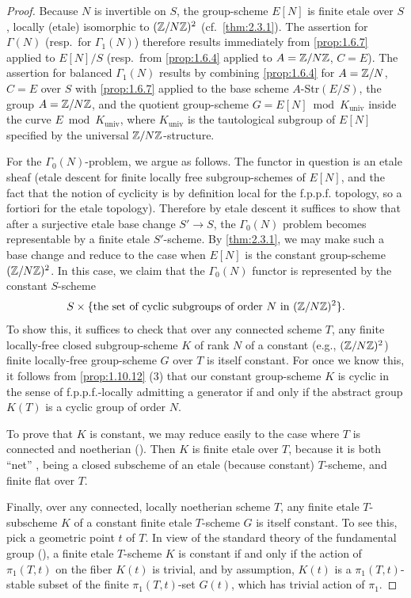\begin{proof}
Because $N$ is invertible on $S$, the group-scheme $E[N]$ is finite etale over $S$, locally (etale) isomorphic to $(\mathbb{Z}/N\mathbb{Z})^2$ (cf.\ \ref{thm:2.3.1}). The assertion for $\Gamma(N)$ (resp.\ for $\Gamma_1(N)$) therefore results immediately from \ref{prop:1.6.7} applied to $E[N]/S$ (resp.\ from \ref{prop:1.6.4} applied to $A = \mathbb{Z}/N\mathbb{Z}$, $C = E$). The assertion for balanced $\Gamma_1(N)$ results by combining \ref{prop:1.6.4} for $A = \mathbb{Z}/N$, $C = E$ over $S$ with \ref{prop:1.6.7} applied to the base scheme $A$-Str$(E/S)$, the group $A = \mathbb{Z}/N\mathbb{Z}$, and the quotient group-scheme $G = E[N] \bmod K_{\mathrm{univ}}$ inside the curve $E \bmod K_{\mathrm{univ}}$, where $K_{\mathrm{univ}}$ is the tautological subgroup of $E[N]$ specified by the universal $\mathbb{Z}/N\mathbb{Z}$-structure.

For the $\Gamma_0(N)$-problem, we argue as follows. The functor in question is an etale sheaf (etale descent \cite[I, 7.9]{SGA} for finite locally free subgroup-schemes of $E[N]$, and the fact that the notion of cyclicity is by definition local for the f.p.p.f. topology, so a fortiori for the etale topology). Therefore by etale descent it suffices to show that after a surjective etale base change $S' \to S$, the $\Gamma_0(N)$ problem becomes representable by a finite etale $S'$-scheme. By \ref{thm:2.3.1}, we may make such a base change and reduce to the case when $E[N]$ is the constant group-scheme $(\mathbb{Z}/N\mathbb{Z})^2$. In this case, we claim that the $\Gamma_0(N)$ functor is represented by the constant $S$-scheme
\[
S \times \{\text{the set of cyclic subgroups of order } N \text{ in } (\mathbb{Z}/N\mathbb{Z})^2\}.
\]
To show this, it suffices to check that over any connected scheme $T$, any finite locally-free closed subgroup-scheme $K$ of rank $N$ of a constant (e.g., $(\mathbb{Z}/N\mathbb{Z})^2$) finite locally-free group-scheme $G$ over $T$ is itself constant. For once we know this, it follows from \ref{prop:1.10.12} (3) that our constant group-scheme $K$ is cyclic in the sense of f.p.p.f.-locally admitting a generator if and only if the abstract group $K(T)$ is a cyclic group of order $N$.

To prove that $K$ is constant, we may reduce easily to the case where $T$ is connected and noetherian (\cite[IV, 8.9.1, 11.2.6.1]{EGA}). Then $K$ is finite etale over $T$, because it is both ``net'' \cite[I, 4.3.1--2]{DeGa}, being a closed subscheme of an etale (because constant) $T$-scheme, and finite flat over $T$.

Finally, over any connected, locally noetherian scheme $T$, any finite etale $T$-subscheme $K$ of a constant finite etale $T$-scheme $G$ is itself constant. To see this, pick a geometric point $t$ of $T$. In view of the standard theory of the fundamental group (\cite[I, Exp.~V, \S7]{SGA}), a finite etale $T$-scheme $K$ is constant if and only if the action of $\pi_1(T,t)$ on the fiber $K(t)$ is trivial, and by assumption, $K(t)$ is a $\pi_1(T,t)$-stable subset of the finite $\pi_1(T,t)$-set $G(t)$, which has trivial action of $\pi_1$.
\end{proof}

